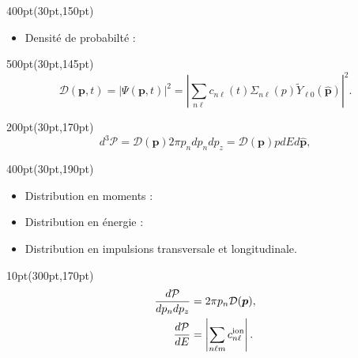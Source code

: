 \begin{frame}
\begin{textblock*}{400pt}(30pt,150pt)
\footnotesize
\begin{itemize}
\item Densit\'e de probabilt\'e :\hspace{50pt}
\end{itemize}
\end{textblock*}


\begin{textblock*}{500pt}(30pt,145pt)
\footnotesize\begin{equation*}
    \mathcal{D}(\boldsymbol{p},t)
   = | \Psi(\boldsymbol{p},t) |^2
    =  \left|  \sum_{n\ell} c_{n\ell}(t) \Sigma_{n\ell}(p)
       \widetilde{Y}_{\ell 0}(\hat{\boldsymbol{p}})\right|^2.
\end{equation*}
\end{textblock*}

\begin{textblock*}{200pt}(30pt,170pt)
\footnotesize
\begin{equation*}
 d^3\mathcal{P}
  = \mathcal{D}(\boldsymbol{p}) 2\pi p_n dp_n dp_z
  = \mathcal{D}(\boldsymbol{p}) pdEd\hat{\boldsymbol{p}},
\end{equation*}
\end{textblock*}


\begin{textblock*}{400pt}(30pt,190pt)
\begin{itemize}
\footnotesize
\item Distribution en moments : 
\item Distribution en \'energie :
\item Distribution en impulsions transversale et longitudinale.
\end{itemize}
\end{textblock*}


\begin{textblock*}{10pt}(300pt,170pt)
\footnotesize
\begin{align*}
   \frac{d\mathcal{P}}{dp_ndp_z}
&  = 2\pi p_n \mathcal{D}(\boldsymbol{p}), \\
   \frac{d\mathcal{P}}{dE}
&  =  \left|\sum_{n\ell m} c_{n\ell}^{\rm ion}\right|.
\end{align*}
\end{textblock*}


\end{frame}


